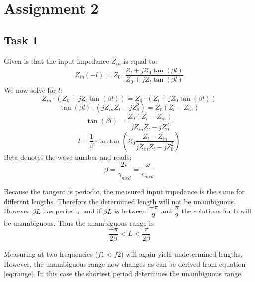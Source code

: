\documentclass[final]{scrreprt} %
\begin{document}
\chapter*{Assignment 2}
\label{ch:sk5-ass2}
\section*{Task 1}
Given is that the input impedance $Z_{in}$ is equal to:
\begin{align}
Z_{in}(-l) = Z_0 \cdot \dfrac{Z_l + jZ_0 \tan (\beta l)}{Z_0 + jZ_l \tan (\beta l)}
\end{align}
We now solve for $l$:
\begin{equation}
Z_{in} \cdot (Z_0 + jZ_l \tan (\beta l)) = Z_0 \cdot (Z_l + jZ_0 \tan (\beta l))
\end{equation}
\begin{equation}
\tan( \beta l) \cdot (jZ_{in} Z_l - jZ_0^2) = Z_0(Z_l - Z_{in})
\end{equation}
\begin{equation}
\tan (\beta l) = \dfrac{Z_0(Z_l - Z_{in})}{jZ_{in} Z_l - jZ_0^2}
\end{equation}
\begin{equation}
\label{eq:beta}
l = \dfrac{1}{\beta} \cdot \arctan (Z_0 \dfrac{Z_l - Z_{in}}{jZ_{in} Z_l - jZ_0^2})
\end{equation}
Beta denotes the wave number and reads:
\begin{equation}
\label{eq:range}
\beta = \dfrac{2 \pi}{\gamma_{med}} = \dfrac{\omega}{c_{med}}
\end{equation}

Because the tangent is periodic, the measured input impedance is the same for different lengths. 
Therefore the determined length will not be unambiguous. However $\beta L$ has period $\pi$ and if $\beta L$ is between $\dfrac{- \pi}{2}$ and $\dfrac{\pi}{2}$ the solutions for L will be unambiguous. 
Thus the unambiguous range is
\begin{equation}
\dfrac{- \pi}{2 \beta} < L < \dfrac{\pi}{2 \beta}
\end{equation}

Measuring at two frequencies ($f1 < f2$) will again yield undetermined lengths. However, the unambiguous range now changes as can be derived from equation \ref{eq:range}. In this case the shortest period determines the unambiguous range.
\end{document}
